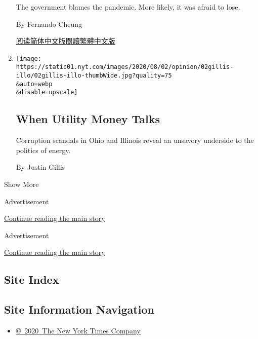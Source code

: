 \begin{enumerate}
  The government blames the pandemic. More likely, it was afraid to
  lose.

  By Fernando Cheung

  \href{https://cn.nytimes.com/opinion/20200803/hong-kong-election-china/}{阅读简体中文版}\href{https://cn.nytimes.com/opinion/20200803/hong-kong-election-china/zh-hant/}{閱讀繁體中文版}
\item
  \href{/2020/08/02/opinion/utility-corruption-energy.html}{}

  \texttt{[image: https://static01.nyt.com/images/2020/08/02/opinion/02gillis-illo/02gillis-illo-thumbWide.jpg?quality=75\\\&auto=webp\\\&disable=upscale]}

  \hypertarget{when-utility-money-talks}{%
  \subsection{When Utility Money Talks}\label{when-utility-money-talks}}

  Corruption scandals in Ohio and Illinois reveal an unsavory underside
  to the politics of energy.

  By Justin Gillis
\end{enumerate}

Show More

Advertisement

\protect\hyperlink{after-mid1}{Continue reading the main story}

Advertisement

\protect\hyperlink{after-mktg}{Continue reading the main story}

\hypertarget{site-index}{%
\subsection{Site Index}\label{site-index}}

\hypertarget{site-information-navigation}{%
\subsection{Site Information
Navigation}\label{site-information-navigation}}

\begin{itemize}
\tightlist
\item
  \href{https://help.nytimes.com/hc/en-us/articles/115014792127-Copyright-notice}{©~2020~The
  New York Times Company}
\end{itemize}

